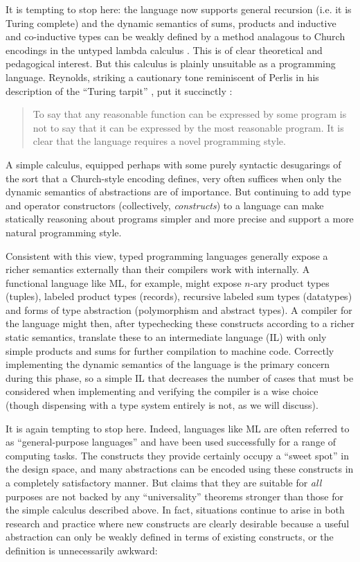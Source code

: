 It is tempting to stop here: the language now supports general recursion (i.e. it is  Turing complete) and the dynamic semantics of sums, products and inductive and co-inductive types can be weakly defined by a method analagous to Church encodings in the untyped lambda calculus \cite{reynolds}. This is of clear theoretical and pedagogical interest. But this calculus is plainly unsuitable as a programming language. Reynolds, striking a cautionary tone reminiscent of Perlis in his description of the ``Turing tarpit'' \cite{perlis}, put it succinctly \cite{reynolds}: 
\begin{quote}
To say that any reasonable function can be expressed by some program is not to say that it can be expressed by the most reasonable program. It is clear that the language requires a novel programming style.
\end{quote}

A simple calculus, equipped perhaps with some purely syntactic desugarings of the sort that a Church-style  encoding defines, very often suffices when only the dynamic semantics of abstractions are of importance. But continuing to add type and operator constructors (collectively, \emph{constructs}) to a language can make statically reasoning about programs simpler and more precise and support a more natural programming style. 

Consistent with this view, typed programming languages generally expose a richer semantics externally than their compilers work with internally.  
A functional language like ML, for example, might expose $n$-ary product types (tuples), labeled product types (records), recursive labeled sum types (datatypes) and forms of type abstraction (polymorphism and abstract  types). A compiler for the language might then, after typechecking these constructs according to a richer static semantics, translate these to an intermediate  language (IL) with only simple products and sums for further compilation to machine code. Correctly implementing the dynamic semantics of the language is the primary concern during this phase, so a simple IL that decreases the number of cases that must be considered when implementing and verifying the compiler is a wise choice (though dispensing with a type system entirely is not, as we will discuss).

It is again tempting to stop here. Indeed, languages like ML are often referred to as ``general-purpose languages'' and have been used successfully for a range of computing tasks. The constructs they provide certainly occupy a ``sweet spot'' in the design space, and many abstractions can be encoded using these constructs in a completely satisfactory manner. But claims that they are suitable for \emph{all} purposes are not backed by any ``universality'' theorems stronger than those for the simple calculus described above. In fact, situations continue to arise in both research and practice where new constructs are clearly desirable because a useful abstraction can only be weakly defined in terms of existing constructs, or the definition is unnecessarily awkward:

